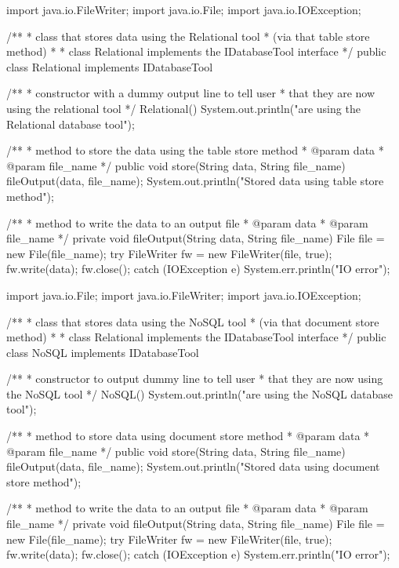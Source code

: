 \documentclass{article}
\begin{document}
\begin{spverbatim}
	import java.io.FileWriter;
	import java.io.File;
	import java.io.IOException;
	
	/**
	* class that stores data using the Relational tool
	* (via that table store method)
	* 
	* class Relational implements the IDatabaseTool interface
	*/
	public class Relational implements IDatabaseTool {
		
	    /**
	    * constructor with a dummy output line to tell user
	    * that they are now using the relational tool
	    */
	    Relational(){ System.out.println("\nYou are using the Relational database tool"); }
		
	    /**
	    * method to store the data using the table store method
	    * @param data
	    * @param file_name 
	    */
	    public void store(String data, String file_name){
	        fileOutput(data, file_name);
	        System.out.println("Stored data using table store method");
	    }
		
	    /**
	    * method to write the data to an output file
	    * @param data
	    * @param file_name 
	    */
	    private void fileOutput(String data, String file_name){
	        File file = new File(file_name);
	        try{
	            FileWriter fw = new FileWriter(file, true);
	            fw.write(data);
	            fw.close();
	        }
	        catch (IOException e){ System.err.println("IO error"); }
	    }
		
	}
\end{spverbatim}

\newpage

\begin{spverbatim}
	import java.io.File;
	import java.io.FileWriter;
	import java.io.IOException;
	
	/**
	* class that stores data using the NoSQL tool
	* (via that document store method)
	* 
	* class Relational implements the IDatabaseTool interface
	*/
	public class NoSQL implements IDatabaseTool {
		
	    /**
	    * constructor to output dummy line to tell user
	    * that they are now using the NoSQL tool
	    */
	    NoSQL(){ System.out.println("\nYou are using the NoSQL database tool"); }
		
	    /**
	    * method to store data using document store method
	    * @param data
	    * @param file_name 
	    */
	    public void store(String data, String file_name){
	        fileOutput(data, file_name);
	        System.out.println("Stored data using document store method");
	    }
		
	    /**
	    * method to write the data to an output file
	    * @param data
	    * @param file_name 
	    */
	    private void fileOutput(String data, String file_name){
	        File file = new File(file_name);
	        try{
	            FileWriter fw = new FileWriter(file, true);
	            fw.write(data);
	            fw.close();
	        }
	        catch (IOException e){ System.err.println("IO error"); }
	    }
	}
\end{spverbatim}
\end{document}
